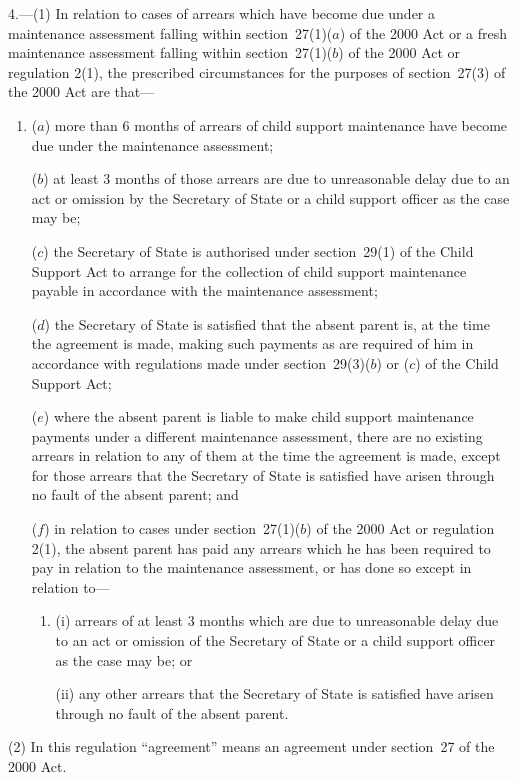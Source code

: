 \documentclass[12pt,a4paper]{article}
\begin{document}
4.---(1)  In relation to cases of arrears which have become due under a maintenance assessment falling within section~27(1)($a$)  of the 2000 Act or a fresh maintenance assessment falling within section~27(1)($b$)  of the 2000 Act or regulation 2(1), the prescribed circumstances for the purposes of section~27(3) of the 2000 Act are that—
\begin{enumerate}\item[]
($a$) more than 6 months of arrears of child support maintenance have become due under the maintenance assessment;

($b$) at least 3 months of those arrears are due to unreasonable delay due to an act or omission by the Secretary of State or a child support officer as the case may be;

($c$) the Secretary of State is authorised under section~29(1) of the Child Support Act to arrange for the collection of child support maintenance payable in accordance with the maintenance assessment;

($d$) the Secretary of State is satisfied that the absent parent is, at the time the agreement is made, making such payments as are required of him in accordance with regulations made under section~29(3)($b$)  or ($c$)  of the Child Support Act;

($e$) where the absent parent is liable to make child support maintenance payments under a different maintenance assessment, there are no existing arrears in relation to any of them at the time the agreement is made, except for those arrears that the Secretary of State is satisfied have arisen through no fault of the absent parent; and

($f$) in relation to cases under section~27(1)($b$)  of the 2000 Act or regulation 2(1), the absent parent has paid any arrears which he has been required to pay in relation to the maintenance assessment, or has done so except in relation to—
\begin{enumerate}\item[]
(i) arrears of at least 3 months which are due to unreasonable delay due to an act or omission of the Secretary of State or a child support officer as the case may be; or

(ii) any other arrears that the Secretary of State is satisfied have arisen through no fault of the absent parent.
\end{enumerate}
\end{enumerate}

(2) In this regulation “agreement” means an agreement under section~27 of the 2000 Act.
\end{document}
